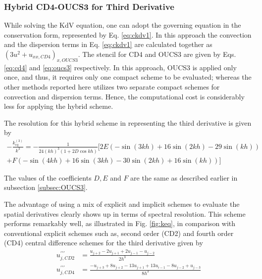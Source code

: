 \documentclass{svjour3}                    %
\begin{document}
\subsubsection{Hybrid CD4-OUCS3 for Third Derivative}
While solving the KdV equation, one can adopt the governing equation in the conservation form, represented by Eq. \eqref{eq:ckdv1}. In this approach the convection and the dispersion terms in Eq. \eqref{eq:ckdv1} are calculated together as $\left(3 u^2 + u_{xx,CD4}\right)_{x,OUCS3}$. The stencil for CD4 and OUCS3 are given by Eqs. \eqref{eq:cd4} and \eqref{eq:oucs3} respectively. In this approach, OUCS3 is applied only once, and thus, it requires only one compact scheme to be evaluated; whereas the other methods reported here utilizes two separate compact schemes for convection and dispersion terms. Hence, the computational cost is considerably less for applying the hybrid scheme.

The resolution for this hybrid scheme in representing the third derivative is given by
\begin{equation}
\begin{aligned}
-\frac{k_{eq}^{(3)}}{k^{3}}=-\frac{1}{24(kh)^{3}(1+2D \cos{kh})} \bigl[ 2E\left(-\sin(3kh)+16\sin(2kh)-29\sin(kh)\right)\\
                            + F\left(-\sin(4kh)+16\sin(3kh)-30\sin(2kh)+16\sin(kh)\right)\bigr]
\end{aligned}
\end{equation}

The values of the coefficients $D,E$ and $F$ are the same as described earlier in subsection \ref{subsec:OUCS3}.

The advantage of using a mix of explicit and implicit schemes to evaluate the spatial derivatives clearly shows up in terms of spectral resolution. This scheme performs remarkably well, as illustrated in Fig. \ref{fig:keq}, in comparison with conventional explicit schemes such as, second order (CD2) and fourth order (CD4) central difference schemes for the third derivative given by
\begin{align}
u^{\prime\prime\prime}_{j,CD2}&=\frac{u_{j+2}-2u_{j+1}+2u_{j-1}-u_{j-2}}{2h^{3}}\\
u^{\prime\prime\prime}_{j,CD4}&=\frac{-u_{j+3} +8u_{j+2} - 13u_{j+1} + 13u_{i-1} - 8u_{j-2} + u_{j-3}}{8h^3}
\end{align}
\end{document}
